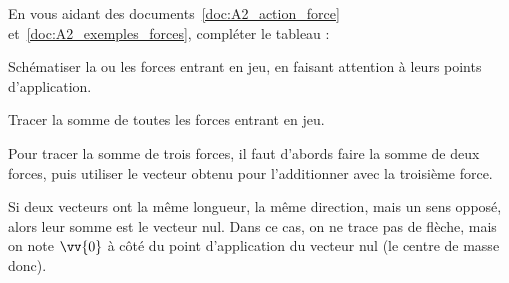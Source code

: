 \mesure 
En vous aidant des documents~\ref{doc:A2_action_force} et~\ref{doc:A2_exemples_forces}, compléter le tableau :
\begin{listePoints}
  \item Schématiser la ou les forces entrant en jeu, en faisant attention à leurs points d'application.
  \item Tracer la somme de toutes les forces entrant en jeu.
\end{listePoints}

\attention Pour tracer la somme de trois forces, il faut d'abords faire la somme de deux forces, puis utiliser le vecteur obtenu pour l'additionner avec la troisième force.

\attention Si deux vecteurs ont la même longueur, la même direction, mais un sens opposé, alors leur somme est le vecteur nul. Dans ce cas, on ne trace pas de flèche, mais on note $\vv{0}$ à côté du point d'application du vecteur nul (le centre de masse donc).
